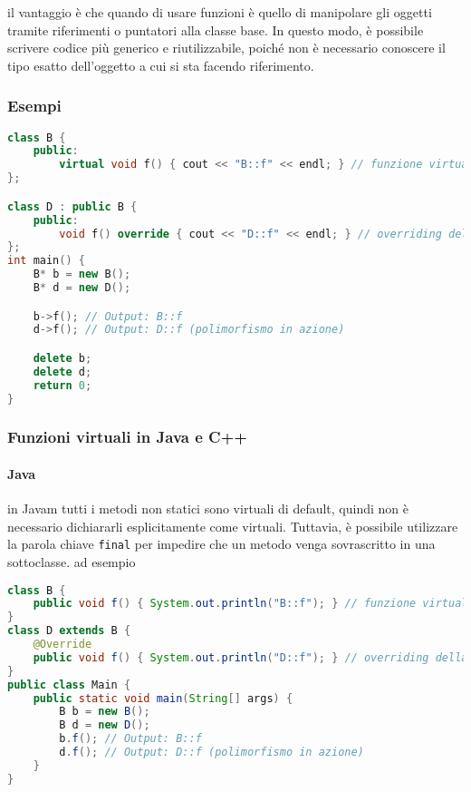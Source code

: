 \documentclass{report}
\begin{document}

il vantaggio è che quando di usare funzioni  è quello di manipolare gli oggetti tramite riferimenti o puntatori alla classe base. In questo modo, è possibile scrivere codice più generico e riutilizzabile, poiché non è necessario conoscere il tipo esatto dell'oggetto a cui si sta facendo riferimento.

\subsubsection{Esempi}

\begin{lstlisting}[language=C++]
class B {
    public:
        virtual void f() { cout << "B::f" << endl; } // funzione virtuale
};

class D : public B {
    public:
        void f() override { cout << "D::f" << endl; } // overriding della funzione virtuale
};
int main() {
    B* b = new B();
    B* d = new D();

    b->f(); // Output: B::f
    d->f(); // Output: D::f (polimorfismo in azione)

    delete b;
    delete d;
    return 0;
}
\end{lstlisting}

\subsubsection{Funzioni virtuali in Java e C++}
\paragraph{Java}
in Javam tutti i metodi non statici sono virtuali di default, quindi non è necessario dichiararli esplicitamente come virtuali. Tuttavia, è possibile utilizzare la parola chiave \texttt{final} per impedire che un metodo venga sovrascritto in una sottoclasse. ad esempio
\begin{lstlisting}[language=Java]
class B {
    public void f() { System.out.println("B::f"); } // funzione virtuale
}
class D extends B {
    @Override
    public void f() { System.out.println("D::f"); } // overriding della funzione virtuale
}
public class Main {
    public static void main(String[] args) {
        B b = new B();
        B d = new D();
        b.f(); // Output: B::f
        d.f(); // Output: D::f (polimorfismo in azione)
    }
}
\end{lstlisting}
\end{document}
